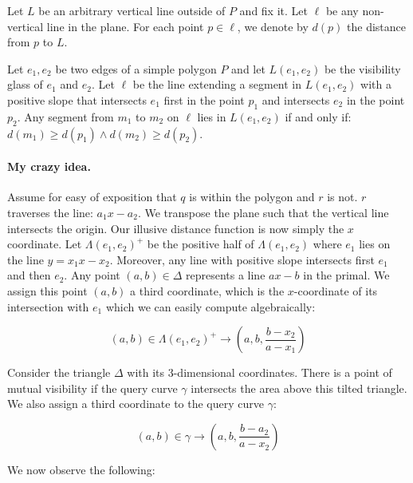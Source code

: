 \documentclass[a4paper, UKenglish]{lipics-v2018}
\begin{document}
Let $L$ be an arbitrary vertical line outside of $P$ and fix it. Let $\ell$ be any non-vertical line in the plane. For each point $p \in \ell$, we denote by $d(p)$ the distance from $p$ to $L$. 

\begin{lemma}
Let $e_1, e_2$ be two edges of a simple polygon $P$ and let $L(e_1, e_2)$ be the visibility glass of $e_1$ and $e_2$. Let $\ell$ be the line extending a segment in $L(e_1, e_2)$ with a positive slope that intersects $e_1$ first in the point $p_1$ and intersects $e_2$ in the point $p_2$. Any segment from $m_1$ to $m_2$ on $\ell$ lies in $L(e_1, e_2)$ if and only if: $d(m_1) \ge d(p_1) \wedge d(m_2) \ge d(p_2)$.
\end{lemma}

\paragraph{My crazy idea.}
Assume for easy of exposition that $q$ is within the polygon and $r$ is not. $r$ traverses the line: $a_1 x - a_2$. We transpose the plane such that the vertical line intersects the origin. Our illusive distance function is now simply the $x$ coordinate. Let $\Lambda(e_1,e_2)^+$ be the positive half of $\Lambda(e_1, e_2)$ where $e_1$ lies on the line $y = x_1 x - x_2$. Moreover, any line with positive slope intersects first $e_1$ and then $e_2$. Any point $(a,b) \in \Delta$ represents a line $ax - b$ in the primal. We assign this point $(a,b)$ a third coordinate, which is the $x$-coordinate of its intersection with $e_1$ which we can easily compute algebraically:

\begin{equation}
    (a,b) \in \Lambda(e_1, e_2)^+ \rightarrow (a, b,  \frac{b - x_2}{a - x_1})
\end{equation}

Consider the triangle $\Delta$ with its 3-dimensional coordinates. There is a point of mutual visibility if the query curve $\gamma$ intersects the area above this tilted triangle. We also assign a third coordinate to the query curve $\gamma$:

\begin{equation}
    (a,b) \in \gamma \rightarrow (a, b, \frac{b - a_2}{a - x_2})
\end{equation}

We now observe the following:
\end{document}
